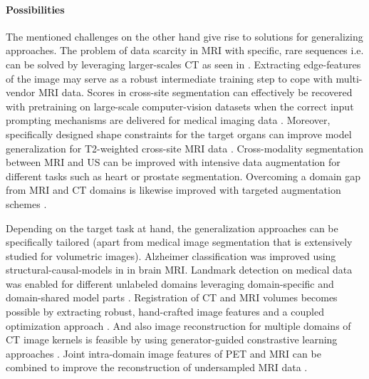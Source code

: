         \paragraph{Possibilities} The mentioned challenges on the other hand give rise to solutions for generalizing approaches.
        The problem of data scarcity in \ac{MRI} with specific, rare sequences i.e. can be solved by leveraging larger-scales \ac{CT} as seen in \citep{han2018deep}.
        Extracting edge-features of the image may serve as a robust intermediate training step to cope with multi-vendor \ac{MRI} data\citep{huang2022online}.
        Scores in cross-site segmentation can effectively be recovered with pretraining on large-scale computer-vision datasets when the correct input prompting mechanisms are delivered for medical imaging data \citep{gao2024desam}.
        Moreover, specifically designed shape constraints for the target organs can improve model generalization for T2-weighted cross-site \ac{MRI} data \citep{liu2020shape}.
        Cross-modality segmentation between \ac{MRI} and \ac{US} can be improved with intensive data augmentation \citep{zhang2020generalizing} for different tasks such as heart or prostate segmentation. Overcoming a domain gap from \ac{MRI} and \ac{CT} domains is likewise improved with targeted augmentation schemes \citep{ouyang2022causality}.

        Depending on the target task at hand, the generalization approaches can be specifically tailored (apart from medical image segmentation that is extensively studied for volumetric images).
        Alzheimer classification was improved using structural-causal-models in \citep{wang2021harmonization} in brain \ac{MRI}. Landmark detection on medical data was enabled for different unlabeled domains leveraging domain-specific and domain-shared model parts  \citep{zhu2023uod}. Registration of \ac{CT} and \ac{MRI} volumes becomes possible by extracting robust, hand-crafted image features and a coupled optimization approach \citep{siebert2021fast}. And also image reconstruction for multiple domains of \ac{CT} image kernels is feasible by using generator-guided constrastive learning approaches \citep{choi2023ct}. Joint intra-domain image features of \ac{PET} and \ac{MRI} can be combined to improve the reconstruction of undersampled \ac{MRI} data \citep{gautier2024bimodal}.




